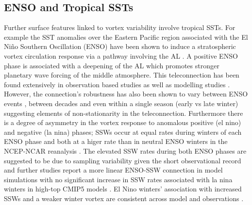 \subsection{ENSO and Tropical SSTs}
Further surface features linked to vortex variability involve tropical SSTs. For example the SST anomalies over the Eastern Pacific region associated with the El Ni\~{n}o Southern Oscillation (ENSO) have been shown to induce a stratospheric vortex circulation response via a pathway involving the AL \citep{domeisenTeleconnection2019}. A positive ENSO phase is associated with a deepening of the AL which promotes stronger planetary wave forcing of the middle atmosphere. This teleconnection has been found extensively in observation based studies \citep{garfinkelDifferent2008, inesonRole2009, smithLinear2012} as well as modelling studies \citep{bellStratospheric2009, domeisenSeasonal2015, manziniInfluence2006, richterEffects2015}. However, the connection's robustness has also been shown to vary between ENSO events \citep{deserNorthern2017, izaStratospheric2016}, between decades \citep{ayarzaguena2018} and even within a single season (early vs late winter) \citep{ayarzaguenaIntraseasonal2018a} suggesting elements of non-stationarity in the teleconnection. Furthermore there is a degree of asymmetry in the vortex response to anomalous positive (el nino) and negative (la nina) phases; SSWs occur at equal rates during winters of each ENSO phase and both at a higer rate than in neutral ENSO winters in the NCEP-NCAR reanalysis \citep{butlerNino2011, garfinkelWhy2012}. The elevated SSW rates during both ENSO phases are suggested to be due to sampling variability given the short observational record and further studies report a more linear ENSO-SSW connection in model simulations \citep{polvaniDistinguishing2017} with no significant increase in SSW rates associated with la nina winters in high-top CMIP5 models \citep{songRevisiting2018}. El Nino winters' association with increased SSWs and a weaker winter vortex are consistent across model and observations \citep{manziniInfluence2006, richterEffects2015}. 

